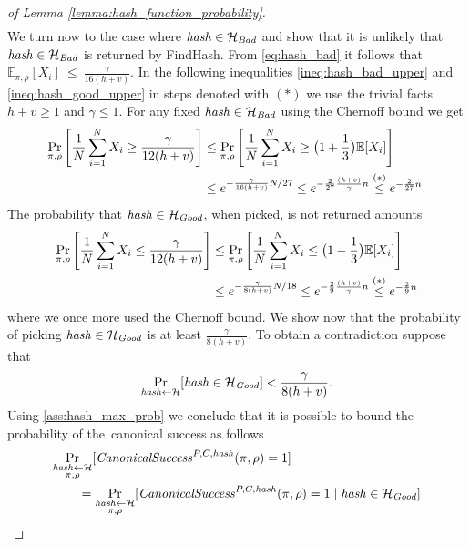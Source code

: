 \begin{proof}[of Lemma \ref{lemma:hash_function_probability}]
\begin{align*}
\end{align*}
We turn now to the case where $\operatorname{\mathit{hash}} \in \mathcal{H}_{\operatorname{\mathit{Bad}}}$ and show that it is unlikely that $\operatorname{\mathit{hash}} \in \mathcal{H}_{\operatorname{\mathit{Bad}}}$
is returned by FindHash.
From \eqref{eq:hash_bad} it follows that $\mathbb{E}_{{\pi}, \rho}[X_i]~\leq~\frac{\gamma}{16(h+v)}$.
In the following inequalities \eqref{ineq:hash_bad_upper} and \eqref{ineq:hash_good_upper} in steps denoted
with $(*)$ we use the trivial facts $h + v \geq 1$ and $\gamma \leq 1$.
For any fixed $\operatorname{\mathit{hash}} \in \mathcal{H}_{\operatorname{\mathit{Bad}}}$ using the Chernoff bound we get
\begin{align}
  \label{ineq:hash_bad_upper}
  \underset{\pi,\rho}{\Pr} \left[\frac{1}{N} \sum_{i=1}^{N} X_i \geq \frac{\gamma}{12(h+v)} \right]
  &\leq \underset{\pi, \rho}{\Pr}\left[\frac{1}{N} \sum_{i=1}^{N} X_i \geq \bigl(1 + \frac{1}{3}\bigr) \mathbb{E}[X_i]\right] \notag\\
  &\leq e^{-{\frac{\gamma}{16(h+v)}} N / 27} \leq e^{-\frac{2}{27}\frac{(h+v)}{\gamma}n} \stackrel{(*)}{\leq} e^{-\frac{2}{27}n}.
\end{align}
The probability that $\operatorname{\mathit{hash}} \in \mathcal{H}_{\operatorname{\mathit{Good}}}$, when picked, is not returned amounts
\begin{align}
  \label{ineq:hash_good_upper}
  \underset{\pi, \rho}{\Pr}\left[\frac{1}{N} \sum_{i=1}^{N} X_i \leq \frac{\gamma}{12(h+v)}\right]
  &\leq \underset{\pi, \rho}{\Pr}\left[\frac{1}{N} \sum_{i=1}^{N} X_i \leq \bigl(1 - \frac{1}{3}\bigr)\mathbb{E}[X_i]\right] \notag\\
  &\leq e^{-{\frac{\gamma}{8(h+v)}} N / 18} \leq e^{-\frac{2}{9} \frac{(h+v)}{\gamma}n} \stackrel{(*)}{\leq} e^{-\frac{2}{9}n}
\end{align}
where we once more used the Chernoff bound.
We show now that the probability of picking $\operatorname{\mathit{hash}} \in \mathcal{H}_{\mathit{Good}}$ is at least $\frac{\gamma}{8(h+v)}$.
To obtain a contradiction suppose that
\begin{align}
  \label{ass:hash_max_prob}
\underset{\operatorname{\mathit{hash}} \leftarrow \mathcal{H}}{\Pr}[\operatorname{\mathit{hash}} \in \mathcal{H}_{\mathit{Good}}] < \frac{\gamma}{8(h+v)}.
\end{align}
Using \eqref{ass:hash_max_prob} we conclude that it is possible to bound the probability of the~canonical success as follows
\begin{align*}
  &\underset{\substack{\hash \leftarrow \cH \\ \pi, \rho}}{\Pr}[\CanonicalSuccess^{P,C,\hash}(\pi, \rho) = 1] \\
  &\IndI = \underset{\substack{ \hash \leftarrow \cH \\ \pi, \rho}}{\Pr}[\CanonicalSuccess^{P,C,\hash}(\pi, \rho) = 1 \mid \hash \in \cH_{\mathit{Good}}]

\end{align*}
\end{proof}
